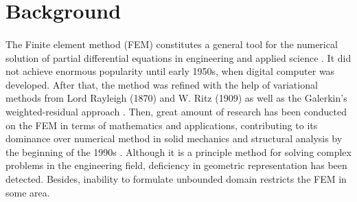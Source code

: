 \section{Background}
\paragraph{}
The Finite element method (FEM) constitutes a general tool for the numerical solution of partial differential equations in engineering and applied science \citep{Ucb2010}.
It did not achieve enormous popularity until early 1950s, when digital computer was developed.
After that, the method was refined with the help of variational methods from Lord Rayleigh (1870) and W. Ritz (1909) as well as the Galerkin's weighted-residual approach \citep{Fel1994}.
Then, great amount of research has been conducted on the FEM in terms of mathematics and applications, contributing to its dominance over numerical method in solid mechanics and structural analysis by the beginning of the 1990s \citep{Clo1980}.
Although it is a principle method for solving complex problems in the engineering field, deficiency in geometric representation has been detected.
Besides, inability to formulate unbounded domain restricts the FEM in some area.

